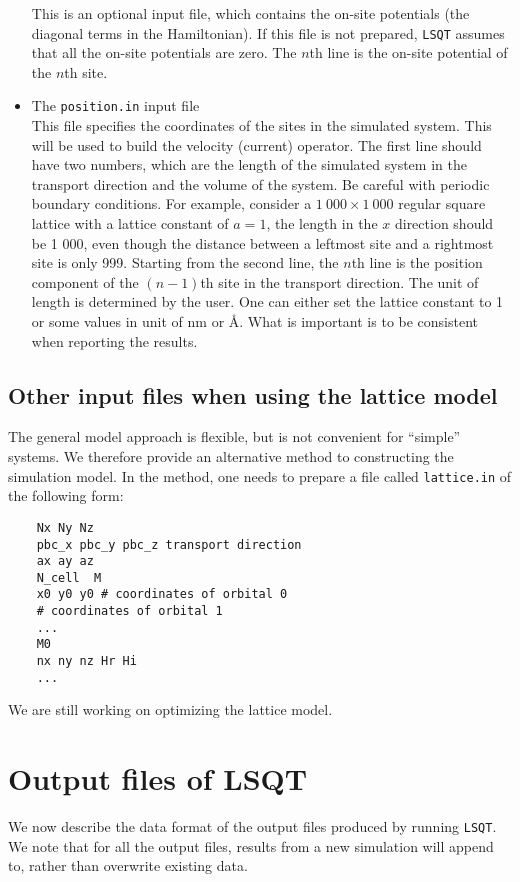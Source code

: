 \documentclass[12pt,a4paper]{report}
\begin{document}
\begin{itemize}
This is an optional input file, which contains the on-site potentials (the diagonal terms in the Hamiltonian). If this file is not prepared, \verb"LSQT" assumes that all the on-site potentials are zero. The $n$th line is the on-site potential of the $n$th site.
\item The \verb"position.in"  input file\\
This file specifies the coordinates of the sites in the simulated system. This will be used to build the velocity (current) operator. The first line should have two numbers, which are the length of the simulated system in the transport direction and the volume of the system. Be careful with periodic boundary conditions. For example, consider a $1~000 \times 1~000$ regular square lattice with a lattice constant of $a=1$, the length in the $x$ direction should be 1 000, even though the distance between a leftmost site and a rightmost site is only 999. Starting from the second line, the $n$th line is the position component of the $(n-1)$th site in the transport direction. The unit of length is determined by the user. One can either set the lattice constant to 1 or some values in unit of nm or \AA. What is important is to be consistent when reporting the results.
\end{itemize}

\subsection{Other input files when using the lattice model}

The general model approach is flexible, but is not convenient for ``simple'' systems. We therefore provide an alternative method to constructing the simulation model. In the method, one needs to prepare a file called \verb"lattice.in" of the following form:
\begin{verbatim}
    Nx Ny Nz
    pbc_x pbc_y pbc_z transport direction
    ax ay az
    N_cell  M
    x0 y0 y0 # coordinates of orbital 0
    # coordinates of orbital 1
    ...
    M0
    nx ny nz Hr Hi
    ...
\end{verbatim}

We are still working on optimizing the lattice model. 

\section{Output files of LSQT}

We now describe the data format of the output files produced by running \verb"LSQT". We note that for all the output files, results from a new simulation will append to, rather than overwrite existing data.
\end{document}
